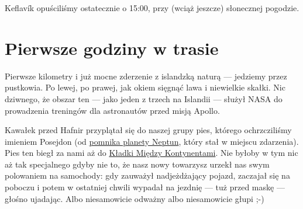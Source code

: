 
Keflavík opuściliśmy ostatecznie o 15:00, przy (wciąż jeszcze) słonecznej pogodzie.


\section*{Pierwsze godziny w trasie}

Pierwsze kilometry i już mocne zderzenie z islandzką naturą --- jedziemy przez pustkowia. Po lewej, po prawej, jak okiem sięgnąć lawa i niewielkie skałki. Nic dziwnego, że obszar ten --- jako jeden z trzech na Islandii --- służył NASA do prowadzenia treningów dla astronautów przed misją Apollo.

Kawałek przed Hafnir przyplątał się do naszej grupy pies, którego ochrzcziliśmy imieniem Posejdon (od \href{https://www.facebook.com/120832791270880/photos/a.612815058739315.1073741825.120832791270880/612815132072641/?type=3&theater}{pomnika planety Neptun}, który stał w miejscu zdarzenia). Pies ten biegł za nami aż do \href{http://www.visitreykjanes.is/searchresults/attraction/bridge-between-continents}{Kładki Między Kontynentami}. Nie byłoby w tym nic aż tak specjalnego gdyby nie to, że nasz nowy towarzysz urzekł nas swym polowaniem na samochody: gdy zauważył nadjeżdżający pojazd, zaczajał się na poboczu i potem w ostatniej chwili wypadał na jezdnię --- tuż przed maskę --- głośno ujadając. Albo niesamowicie odważny albo niesamowicie głupi ;-)

